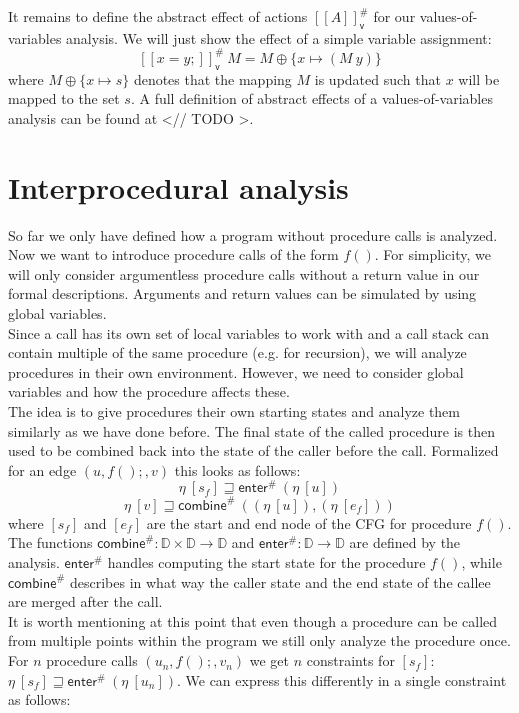     It remains to define the abstract effect of actions $[\![A]\!]^{\#}_\textsf{v}$ for our values-of-variables analysis. We will just show the effect of a simple variable assignment:
    \[ [\![ x=y; ]\!]^{\#}_\textsf{v}\ M = M \oplus \{x \mapsto (M\ y) \} \]
    where $M \oplus \{x \mapsto s\}$ denotes that the mapping $M$ is updated such that $x$ will be mapped to the set $s$. A full definition of abstract effects of a values-of-variables analysis can be found at <// TODO >.\\

  \section{Interprocedural analysis}
    So far we only have defined how a program without procedure calls is analyzed. Now we want to introduce procedure calls of the form $f()$. For simplicity, we will only consider argumentless procedure calls without a return value in our formal descriptions. Arguments and return values can be simulated by using global variables.\\
    Since a call has its own set of local variables to work with and a call stack can contain multiple of the same procedure (e.g. for recursion), we will analyze procedures in their own environment. However, we need to consider global variables and how the procedure affects these.\\
    The idea is to give procedures their own starting states and analyze them similarly as we have done before. The final state of the called procedure is then used to be combined back into the state of the caller before the call. Formalized for an edge $(u, f();, v)$ this looks as follows:
    \[\eta\ [s_f] \sqsupseteq \textsf{enter}^{\#}\ (\eta\ [u]) \]
    \[\eta\ [v] \sqsupseteq  \textsf{combine}^{\#}\ ((\eta\ [u]), (\eta\ [e_f])) \]
    where $[s_f]$ and $[e_f]$ are the start and end node of the \ac{CFG} for procedure $f()$. The functions $\textsf{combine}^{\#}: \mathbb{D} \times \mathbb{D} \rightarrow \mathbb{D}$ and $\textsf{enter}^{\#}: \mathbb{D} \rightarrow \mathbb{D}$ are defined by the analysis. $\textsf{enter}^{\#}$ handles computing the start state for the procedure $f()$, while $\textsf{combine}^{\#}$ describes in what way the caller state and the end state of the callee are merged after the call.\\
    It is worth mentioning at this point that even though a procedure can be called from multiple points within the program we still only analyze the procedure once. For $n$ procedure calls $(u_n, f();, v_n)$ we get $n$ constraints for $[s_f]$: $\eta\ [s_f] \sqsupseteq \textsf{enter}^{\#}\ (\eta\ [u_n])$. We can express this differently in a single constraint as follows:
